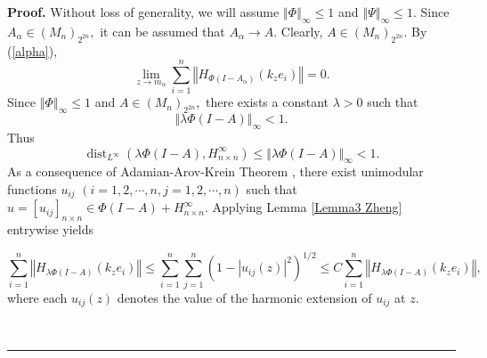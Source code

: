 \documentclass{article}%
\newenvironment{proof}[1][Proof]{\noindent\textbf{#1.} }{\ \rule{0.5em}{0.5em}}
\begin{document}
\begin{proof}
Without loss of generality, we will assume $\left\Vert \Phi\right\Vert
_{\infty}\leq1$ and $\left\Vert \Psi\right\Vert _{\infty}\leq1.$ Since
$A_{\alpha}\in\left(  M_{n}\right)  _{2^{2n}},$ it can be assumed that
$A_{\alpha}\rightarrow A$. Clearly, $A\in\left(  M_{n}\right)  _{2^{2n}}.$ By
(\ref{alpha}),
\[
\lim_{z\rightarrow m_{\alpha}}\sum_{i=1}^{n}\left\Vert H_{\Phi(I-A_{\alpha}%
)}\left(  k_{z}e_{i}\right)  \right\Vert =0.
\]
Since $\left\Vert \Phi\right\Vert _{\infty}\leq1$ and $A\in\left(
M_{n}\right)  _{2^{2n}},$ there exists a constant $\lambda>0$ such that
\[
\Vert\lambda\Phi(I-A)\Vert_{\infty}<1.
\]
Thus%
\[
\operatorname{dist}_{L^{\infty}}\left(  \lambda\Phi(I-A),H_{n\times n}%
^{\infty}\right)  \leq\Vert\lambda\Phi(I-A)\Vert_{\infty}<1.
\]
As a consequence of Adamian-Arov-Krein Theorem \cite{Garnett}, there exist
unimodular functions $u_{ij}$ $(i=1,2,\cdots,n,j=1,2,\cdots,n)$ such that
$u=\left[  u_{ij}\right]_{n\times n}  \in\Phi(I-A)+H_{n\times n}^{\infty}$. Applying Lemma \ref{Lemma3 Zheng} entrywise yields%

\begin{equation}
\sum_{i=1}^{n}\left\Vert H_{\lambda\Phi(I-A)}\left(  k_{z}e_{i}\right)
\right\Vert \leq\sum_{i=1}^{n}\sum_{j=1}^{n}\left(  1-\left\vert
u_{ij}(z)\right\vert ^{2}\right)  ^{1/2}\leq C\sum_{i=1}^{n}\left\Vert
H_{\lambda\Phi(I-A)}\left(  k_{z}e_{i}\right)  \right\Vert ,\label{unimodular}%
\end{equation}
where each $u_{ij}(z)$ denotes the value of the harmonic extension of $u_{ij}$
at $z$.


\end{proof}
\end{document}
